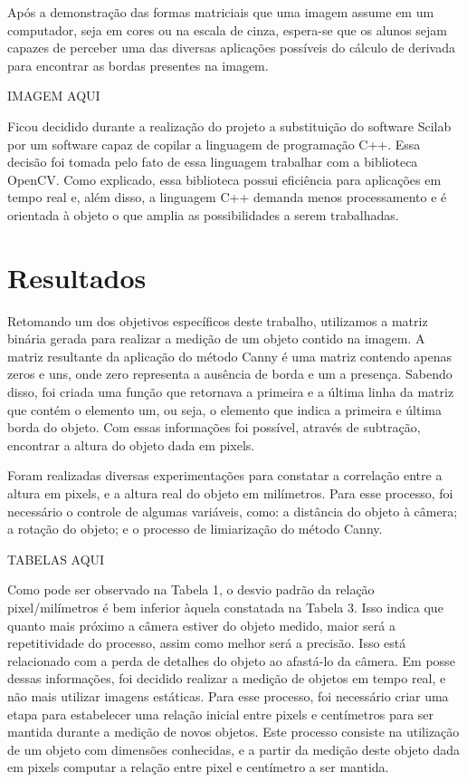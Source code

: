 \documentclass[12pt]{article}
\begin{document}
	Após a demonstração das formas matriciais que uma imagem assume em um computador, seja em cores ou na escala de cinza, espera-se que os alunos sejam capazes de perceber uma das diversas aplicações possíveis do cálculo de derivada para encontrar as bordas presentes na imagem.
	
	IMAGEM AQUI 
	
	Ficou decidido durante a realização do projeto a substituição do software Scilab por um software capaz de copilar a linguagem de programação C++. Essa decisão foi tomada pelo fato de essa linguagem trabalhar com a biblioteca OpenCV. Como explicado, essa biblioteca possui eficiência para aplicações em tempo real e, além disso, a linguagem C++ demanda menos processamento e é orientada à objeto o que amplia as possibilidades a serem trabalhadas.
	
	\section{Resultados}
	
	Retomando um dos objetivos específicos deste trabalho, utilizamos a matriz binária gerada para realizar a medição de um objeto contido na imagem. A matriz resultante da aplicação do método Canny é uma matriz contendo apenas zeros e uns, onde zero representa a ausência de borda e um a presença. Sabendo disso, foi criada uma função que retornava a primeira e a última linha da matriz que contém o elemento um, ou seja, o elemento que indica a primeira e
	última borda do objeto. Com essas informações foi possível, através de subtração, encontrar a altura do objeto dada em pixels.
	
	Foram realizadas diversas experimentações para constatar a correlação entre a altura em pixels, e a altura real do objeto em milímetros. Para esse processo, foi necessário o controle de algumas variáveis, como: a distância do objeto à câmera; a rotação do objeto; e o processo de limiarização do método Canny.
	
	TABELAS AQUI
	
	Como pode ser observado na Tabela 1, o desvio padrão da relação pixel/milímetros é bem inferior àquela constatada na Tabela 3. Isso indica que quanto mais próximo a câmera estiver do objeto medido, maior será a repetitividade do processo, assim como melhor será a precisão. Isso está relacionado com a perda de detalhes do objeto ao afastá-lo da câmera. Em posse dessas informações, foi decidido realizar a medição de objetos em tempo real, e não mais utilizar imagens estáticas. Para esse processo, foi necessário criar uma etapa para estabelecer uma relação inicial entre pixels e centímetros para ser mantida durante a medição de novos objetos. Este processo consiste na utilização de um objeto com dimensões conhecidas, e a partir da medição deste objeto dada em pixels computar a relação entre pixel e centímetro a ser mantida.
	
\end{document}
